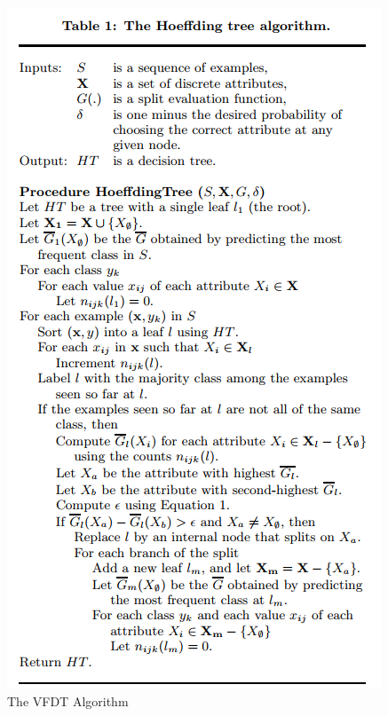 \documentclass[sigplan]{acmart}\settopmatter{printfolios=true,printccs=false,printacmref=false}
\begin{document}
\begin{figure}
	\includegraphics[width=\linewidth]{figs/vfdt.PNG}
	\caption{The VFDT Algorithm}
	\label{fig:vfdt}
\end{figure}
\end{document}
